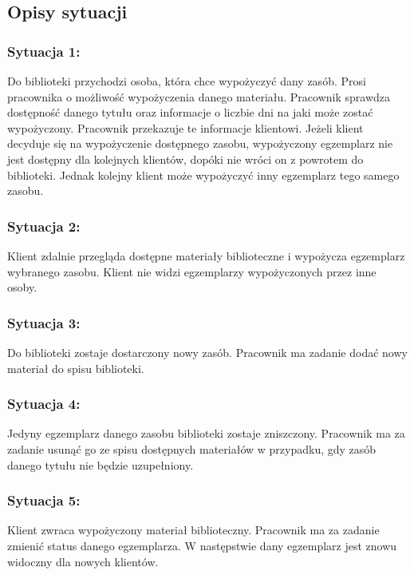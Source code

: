 \subsection{Opisy sytuacji}
    \subsubsection*{Sytuacja 1:}
    Do biblioteki przychodzi osoba, która chce wypożyczyć dany zasób. Prosi pracownika o możliwość wypożyczenia danego materiału. Pracownik sprawdza dostępność danego tytułu oraz informacje o liczbie dni na jaki może zostać wypożyczony. Pracownik przekazuje te informacje klientowi. Jeżeli klient decyduje się na wypożyczenie dostępnego zasobu, wypożyczony egzemplarz nie jest dostępny dla kolejnych klientów, dopóki nie wróci on z powrotem do biblioteki. Jednak kolejny klient może wypożyczyć inny egzemplarz tego samego zasobu.
    
    \subsubsection*{Sytuacja 2:}
    Klient zdalnie przegląda dostępne materiały biblioteczne i wypożycza egzemplarz wybranego zasobu. Klient nie widzi egzemplarzy wypożyczonych przez inne osoby.

    \subsubsection*{Sytuacja 3:}
    Do biblioteki zostaje dostarczony nowy zasób. Pracownik ma zadanie dodać nowy materiał do spisu biblioteki.

    \subsubsection*{Sytuacja 4:}
    Jedyny egzemplarz danego zasobu biblioteki zostaje zniszczony. Pracownik ma za zadanie usunąć go ze spisu dostępnych materiałów w przypadku, gdy zasób danego tytułu nie będzie uzupełniony.

    \subsubsection*{Sytuacja 5:}
    Klient zwraca wypożyczony materiał biblioteczny. Pracownik ma za zadanie zmienić status danego egzemplarza. W następstwie dany egzemplarz jest znowu widoczny dla nowych klientów.